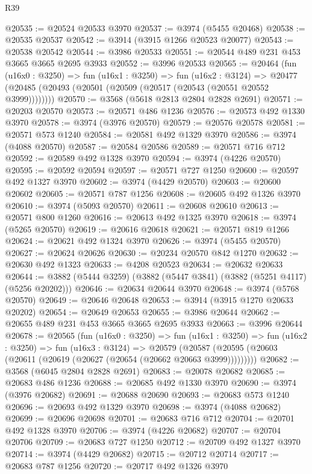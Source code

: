 \begin{lexlean}{R39}
\begin{coremodule}
@20535 := @20524 @20533 @3970
@20537 := @3974 (@5455 @20468)
@20538 := @20535 @20537
@20542 := @3914 (@3915 @1266 @20523 @20077)
@20543 := @20538 @20542
@20544 := @3986 @20533
@20551 := @20544 @489 @231 @453 @3665 @3665 @2695 @3933
@20552 := @3996 @20533
@20565 := @20464
    (fun (u16x0 : @3250) =>
    fun (u16x1 : @3250) =>
    fun (u16x2 : @3124) =>
    @20477 (@20485 (@20493 (@20501 (@20509 (@20517 (@20543 (@20551 @20552 @3999))))))))
@20570 := @3568 (@5618 @2813 @2804 @2828 @2691)
@20571 := @20203 @20570
@20573 := @20571 @486 @1236
@20576 := @20573 @492 @1330 @3970
@20578 := @3974 (@3976 @20570)
@20579 := @20576 @20578
@20581 := @20571 @573 @1240
@20584 := @20581 @492 @1329 @3970
@20586 := @3974 (@4088 @20570)
@20587 := @20584 @20586
@20589 := @20571 @716 @712
@20592 := @20589 @492 @1328 @3970
@20594 := @3974 (@4226 @20570)
@20595 := @20592 @20594
@20597 := @20571 @727 @1250
@20600 := @20597 @492 @1327 @3970
@20602 := @3974 (@4429 @20570)
@20603 := @20600 @20602
@20605 := @20571 @787 @1256
@20608 := @20605 @492 @1326 @3970
@20610 := @3974 (@5093 @20570)
@20611 := @20608 @20610
@20613 := @20571 @800 @1260
@20616 := @20613 @492 @1325 @3970
@20618 := @3974 (@5265 @20570)
@20619 := @20616 @20618
@20621 := @20571 @819 @1266
@20624 := @20621 @492 @1324 @3970
@20626 := @3974 (@5455 @20570)
@20627 := @20624 @20626
@20630 := @20234 @20570 @842 @1270
@20632 := @20630 @492 @1323
@20633 := @4208 @20523
@20634 := @20632 @20633
@20644 := @3882 (@5444 @3259) (@3882 (@5447 @3841) (@3882 (@5251 @4117) (@5256 @20202)))
@20646 := @20634 @20644 @3970
@20648 := @3974 (@5768 @20570)
@20649 := @20646 @20648
@20653 := @3914 (@3915 @1270 @20633 @20202)
@20654 := @20649 @20653
@20655 := @3986 @20644
@20662 := @20655 @489 @231 @453 @3665 @3665 @2695 @3933
@20663 := @3996 @20644
@20678 := @20565
    (fun (u16x0 : @3250) =>
    fun (u16x1 : @3250) =>
    fun (u16x2 : @3250) =>
    fun (u16x3 : @3124) =>
    @20579 (@20587 (@20595 (@20603 (@20611 (@20619 (@20627 (@20654 (@20662 @20663 @3999)))))))))
@20682 := @3568 (@6045 @2804 @2828 @2691)
@20683 := @20078 @20682
@20685 := @20683 @486 @1236
@20688 := @20685 @492 @1330 @3970
@20690 := @3974 (@3976 @20682)
@20691 := @20688 @20690
@20693 := @20683 @573 @1240
@20696 := @20693 @492 @1329 @3970
@20698 := @3974 (@4088 @20682)
@20699 := @20696 @20698
@20701 := @20683 @716 @712
@20704 := @20701 @492 @1328 @3970
@20706 := @3974 (@4226 @20682)
@20707 := @20704 @20706
@20709 := @20683 @727 @1250
@20712 := @20709 @492 @1327 @3970
@20714 := @3974 (@4429 @20682)
@20715 := @20712 @20714
@20717 := @20683 @787 @1256
@20720 := @20717 @492 @1326 @3970

\end{coremodule}
\end{lexlean}

